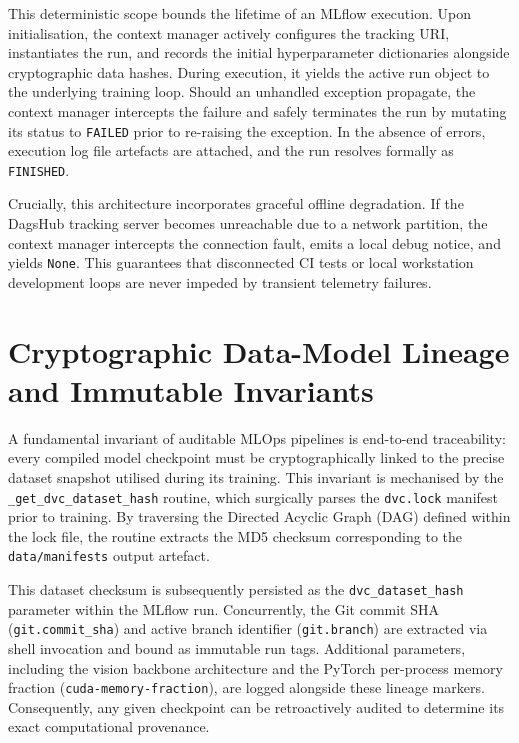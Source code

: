 This deterministic scope bounds the lifetime of an MLflow execution. Upon initialisation, the context manager actively configures the tracking URI, instantiates the run, and records the initial hyperparameter dictionaries alongside cryptographic data hashes. During execution, it yields the active run object to the underlying training loop. Should an unhandled exception propagate, the context manager intercepts the failure and safely terminates the run by mutating its status to \texttt{FAILED} prior to re-raising the exception. In the absence of errors, execution log file artefacts are attached, and the run resolves formally as \texttt{FINISHED}.

Crucially, this architecture incorporates graceful offline degradation. If the DagsHub tracking server becomes unreachable due to a network partition, the context manager intercepts the connection fault, emits a local debug notice, and yields \texttt{None}. This guarantees that disconnected CI tests or local workstation development loops are never impeded by transient telemetry failures.

\section{Cryptographic Data-Model Lineage and Immutable Invariants}
\label{sec:cryptographic_lineage_and_promotion}



A fundamental invariant of auditable MLOps pipelines is end-to-end traceability: every compiled model checkpoint must be cryptographically linked to the precise dataset snapshot utilised during its training. This invariant is mechanised by the \texttt{\_get\_dvc\_dataset\_hash} routine, which surgically parses the \texttt{dvc.lock} manifest prior to training. By traversing the Directed Acyclic Graph (DAG) defined within the lock file, the routine extracts the MD5 checksum corresponding to the \texttt{data/manifests} output artefact.

This dataset checksum is subsequently persisted as the \texttt{dvc\_dataset\_hash} parameter within the MLflow run. Concurrently, the Git commit SHA (\texttt{git.commit\_sha}) and active branch identifier (\texttt{git.branch}) are extracted via shell invocation and bound as immutable run tags. Additional parameters, including the vision backbone architecture and the PyTorch per-process memory fraction (\texttt{cuda-memory-fraction}), are logged alongside these lineage markers. Consequently, any given checkpoint can be retroactively audited to determine its exact computational provenance.

